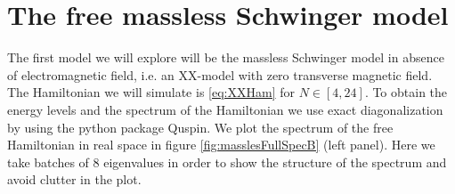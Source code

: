 \section{The free massless Schwinger model}

The first model we will explore will be the massless Schwinger model in absence of electromagnetic field, i.e. an XX-model with zero transverse magnetic field. The Hamiltonian we will simulate is \ref{eq:XXHam} for $N\in[4,24]$. To obtain the energy levels and the spectrum of the Hamiltonian we use exact diagonalization by using the python package Quspin. We plot the spectrum of the free Hamiltonian in real space in figure \ref{fig:masslesFullSpecB} (left panel). Here we take batches of $8$ eigenvalues in order to show the structure of the spectrum and avoid clutter in the plot.


